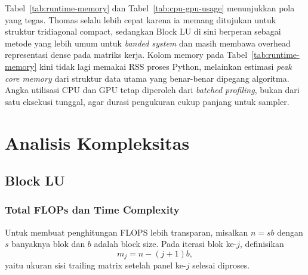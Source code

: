 \documentclass[12pt,a4paper]{article}
\begin{document}
\begin{table}[h]
\centering
\caption{Perbandingan CPU usage dan GPU usage antara Block LU dan Thomas algorithm.}
\label{tab:cpu-gpu-usage}
\end{table}

Tabel~\ref{tab:runtime-memory} dan Tabel~\ref{tab:cpu-gpu-usage} menunjukkan pola yang tegas. Thomas selalu lebih cepat karena ia memang ditujukan untuk struktur tridiagonal compact, sedangkan Block LU di sini berperan sebagai metode yang lebih umum untuk \emph{banded system} dan masih membawa overhead representasi dense pada matriks kerja. Kolom memory pada Tabel~\ref{tab:runtime-memory} kini tidak lagi memakai RSS proses Python, melainkan estimasi \emph{peak core memory} dari struktur data utama yang benar-benar dipegang algoritma. Angka utilisasi CPU dan GPU tetap diperoleh dari \emph{batched profiling}, bukan dari satu eksekusi tunggal, agar durasi pengukuran cukup panjang untuk sampler.

\section{Analisis Kompleksitas}
\subsection{Block LU}
\subsubsection*{Total FLOPs dan Time Complexity}
Untuk membuat penghitungan FLOPS lebih transparan, misalkan $n = sb$ dengan $s$ banyaknya blok dan $b$ adalah block size. Pada iterasi blok ke-$j$, definisikan
\[
m_j = n - (j+1)b,
\]
yaitu ukuran sisi trailing matrix setelah panel ke-$j$ selesai diproses.
\end{document}
